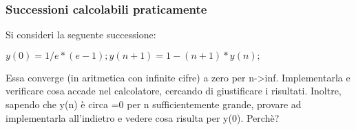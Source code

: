 
\subsubsection{Successioni calcolabili praticamente}

Si consideri la seguente successione:

\begin{center}
	$y(0)=1/e*(e-1);		y(n+1)=1-(n+1)*y(n);$
\end{center}

Essa converge (in aritmetica con infinite cifre) a zero per n->inf. Implementarla e verificare cosa accade nel calcolatore, cercando di giustificare i risultati. Inoltre, sapendo che y(n) è circa =0 per n sufficientemente grande, provare ad implementarla all'indietro e vedere cosa risulta per y(0). Perchè?

